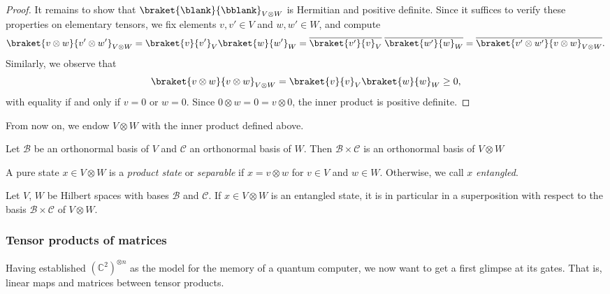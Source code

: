 \documentclass[a4paper,oneside, 12pt]{amsart}
\begin{document}
\begin{proof}
  It remains to show that \( \braket{\blank}{\bblank}_{V \otimes W} \) is Hermitian and positive definite.
  Since it suffices to verify these properties on elementary tensors, we fix elements  \(v, v' \in V\) and \(w,w' \in W\), and compute
  \begin{equation*}
  \braket{v \otimes w}{v' \otimes w'}_{V \otimes W} = \braket{v}{v'}_V \braket{w}{w'}_W = \overline{\braket{v'}{v}_V} \; \overline{\braket{w'}{w}_W} = \overline{\braket{v' \otimes w'}{v \otimes w}_{V \otimes W}}.
  \end{equation*}
  Similarly, we observe that
  \begin{equation*}
      \braket{v \otimes w}{v \otimes w}_{V \otimes W} = \braket{v}{v}_V \braket{w}{w}_W \geq 0,
  \end{equation*}
  with equality if and only if \( v = 0 \) or \( w = 0 \).
  Since \( 0 \otimes w = 0 = v \otimes 0 \), the inner product is positive definite.
\end{proof}

From now on, we endow \( V \otimes W \) with the inner product defined above.

\begin{corollary}\label{cor:onbs-tensor-to-onbs}
  Let \(\mathcal{B}\) be an orthonormal basis of \(V\) and \(\mathcal{C}\) an orthonormal basis of \(W\).
  Then \(\mathcal{B}\times \mathcal{C}\) is an orthonormal basis of \(V\otimes W\)
\end{corollary}


\begin{definition}\label{def:entangled-state}
  A pure state \( x \in V \otimes W \) is a \emph{product state} or \emph{separable} if \(x = v\otimes w\) for \(v\in V\) and \(w \in W\).
  Otherwise, we call \(x\) \emph{entangled}.
\end{definition}

\begin{remark}\label{rmk:comparison-superposition-vs-entanglement}
  Let \(V\), \(W\) be Hilbert spaces with bases \(\mathcal{B}\) and \(\mathcal{C}\).
  If  \(x\in V\otimes W \) is an entangled state, it is in particular in a superposition with respect to the basis \(\mathcal{B}\times \mathcal{C}\) of \(V\otimes W\).
\end{remark}


\subsubsection{Tensor products of matrices}\label{sec:tensor-products-of-matrices}
Having established \( (\mathbb{C}^{2})^{\otimes n}\) as the model for the memory of a quantum computer, we now want to get a first glimpse at its gates.
That is, linear maps and matrices between tensor products.
\end{document}
